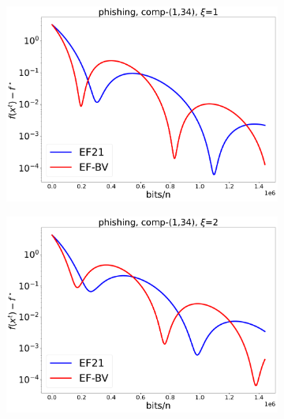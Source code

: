 \documentclass{article} %
\theoremstyle{plain}
\theoremstyle{definition}
\theoremstyle{remark}
\begin{document}
\begin{figure}[!htbp]
\begin{subfigure}[b]{0.32\textwidth}
      \includegraphics[width=\textwidth]{img/phishing/CompK_34_1_phishing_8124workers_3000K_11055_phishing_34_1_1_1_logreg_diff_nonconv.pdf}
   \end{subfigure}
   \hfill
   \begin{subfigure}[b]{0.32\textwidth}
      \centering
      \includegraphics[width=\textwidth]{img/phishing/CompK_34_1_phishing_8124workers_3000K_11055_phishing_34_1_1_2_logreg_diff_nonconv.pdf}
   \end{subfigure}
   \hfill
   \begin{subfigure}[b]{0.32\textwidth}
      \centering

\end{subfigure}
\end{figure}
\end{document}
